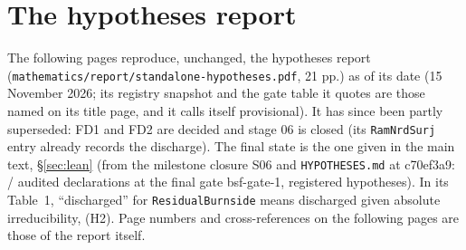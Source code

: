 \section{The hypotheses report}\label{app:hyp}
The following pages reproduce, unchanged, the hypotheses report \cite{LLhyp}
(\texttt{mathematics/report/standalone-hypotheses.pdf}, 21 pp.) as of its date (15 November 2026; its registry snapshot and
the gate table it quotes are those named on its title page, and it calls itself provisional). It has since been partly
superseded: FD1 and FD2 are decided and stage 06 is closed (its \texttt{RamNrdSurj} entry already records the discharge). The final state is the one given in the main text,
\S\ref{sec:lean} (from the milestone closure S06 and \texttt{HYPOTHESES.md} at c70ef3a9: \GateAudited/\GateAudited{} audited declarations at the final gate bsf-gate-1,
\NumHypRegistered{} registered hypotheses). In its Table~1, ``discharged'' for \texttt{ResidualBurnside} means discharged given absolute irreducibility, (H2). Page numbers and cross-references on the following pages are those of the report itself.

